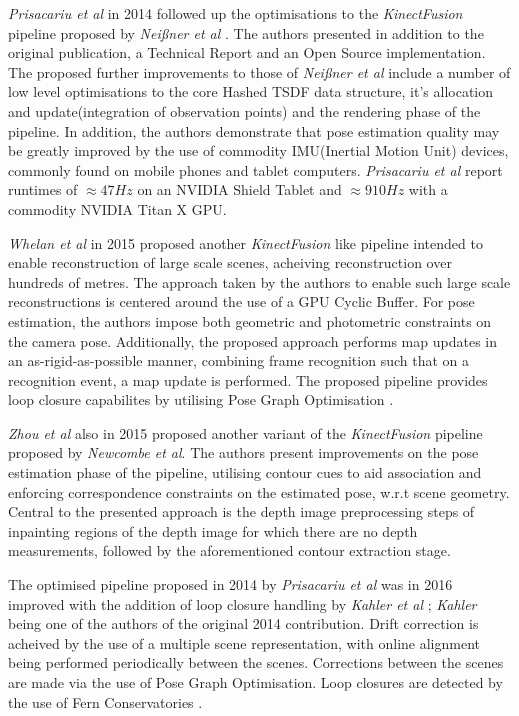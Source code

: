 \textit{Prisacariu et al} \cite{Prisacariu2014, Kahler2015} in 2014 followed up the optimisations 
to the \textit{KinectFusion} pipeline proposed by \textit{Nei{\ss}ner et al} \cite{NieBner2013}. 
The authors presented in addition to the original publication, a Technical Report and an Open 
Source implementation. The proposed further improvements to those of \textit{Nei{\ss}ner et al} 
\cite{NieBner2013} include a number of low level optimisations to the core Hashed TSDF data 
structure, it's allocation and update(integration of observation points) and the rendering 
phase of the pipeline. In addition, the authors demonstrate that pose estimation quality may 
be greatly improved by the use of commodity IMU(Inertial Motion Unit) devices, commonly found 
on mobile phones and tablet computers. \textit{Prisacariu et al} report runtimes of 
$\approx47Hz$ on an NVIDIA Shield Tablet and $\approx910Hz$ with a commodity NVIDIA Titan X GPU.

\textit{Whelan et al} \cite{Whelan2015} in 2015 proposed another \textit{KinectFusion} 
\cite{Newcombe2011} like pipeline intended to enable reconstruction of large scale scenes, 
acheiving reconstruction over hundreds of metres. The approach taken by the authors to enable 
such large scale reconstructions is centered around the use of a GPU Cyclic Buffer. For pose 
estimation, the authors impose both geometric and photometric constraints on the camera pose. 
Additionally, the proposed approach performs map updates in an as-rigid-as-possible \cite{ARAP} 
manner, combining frame recognition such that on a recognition event, a map update is performed.
The proposed pipeline provides loop closure capabilites by utilising Pose Graph Optimisation 
\cite{PGO}.

\textit{Zhou et al} \cite{Zhou2015} also in 2015 proposed another variant of the 
\textit{KinectFusion} \cite{Newcombe2011} pipeline proposed by \textit{Newcombe et al}. 
The authors present improvements on the pose estimation phase of the pipeline, utilising 
contour cues to aid association and enforcing correspondence constraints on the estimated 
pose, w.r.t scene geometry. Central to the presented approach is the depth image preprocessing 
steps of inpainting regions of the depth image for which there are no depth measurements, 
followed by the aforementioned contour extraction stage.

The optimised pipeline proposed in 2014 by \textit{Prisacariu et al} was in 2016 improved with 
the addition of loop closure handling by \textit{Kahler et al} \cite{Kahler2016}; \textit{Kahler} 
being one of the authors of the original 2014 contribution. Drift correction is acheived by the 
use of a multiple scene representation, with online alignment being performed periodically 
between the scenes. Corrections between the scenes are made via the use of Pose Graph Optimisation. 
Loop closures are detected by the use of Fern Conservatories \cite{GLOCKER}.

